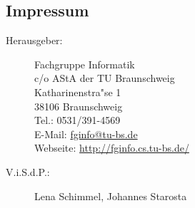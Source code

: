 \newpage
\subsection{Impressum}
\label{impressum}
\begin{description}
\item[Herausgeber:]
	Fachgruppe Informatik\\
	c/o AStA der TU Braunschweig\\
	Katharinenstra"se 1\\
	38106 Braunschweig\\
	Tel.: 0531/391-4569\\
	E-Mail: \url{fginfo@tu-bs.de}\\
	Webseite: \url{http://fginfo.cs.tu-bs.de/}
\item[V.i.S.d.P.:]  %
  Lena Schimmel, Johannes Starosta
\end{description}